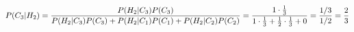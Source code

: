 \documentclass[preview]{standalone}
\begin{document}
\begin{align*}
\special{dvisvgm:raw <g id='unique000'>}P(C_3|H_2)=\dfrac{P(H_2|C_3)P(C_3)}{P(H_2|C_3)P(C_3)+P(H_2|C_1)P(C_1)+P(H_2|C_2)P(C_2)}=\dfrac{1\cdot\frac{1}{3}}{1\cdot\frac{1}{3}+\frac{1}{2}\cdot\frac{1}{3}+0}=\dfrac{1/3}{1/2}=\dfrac{2}{3}\special{dvisvgm:raw </g>}
\end{align*}
\end{document}

